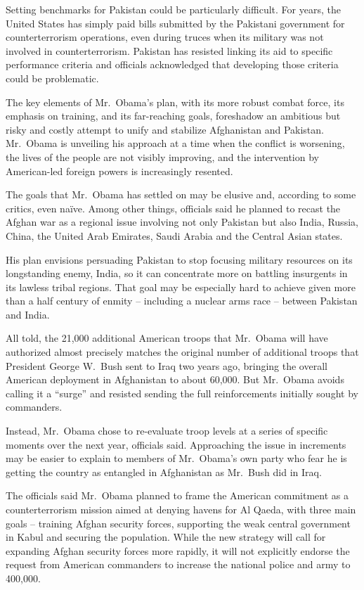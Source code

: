 \documentclass[12pt,a4paper,onecolumn]{article}
\begin{document}
\begin{CJK*}{GBK}{song}
Setting benchmarks for Pakistan could be particularly difficult. For years, the United States has
simply paid bills submitted by the Pakistani government for counterterrorism operations, even during
truces when its military was not involved in counterterrorism. Pakistan has resisted linking its aid
to specific performance criteria and officials acknowledged that developing those criteria could be
problematic.

The key elements of Mr.~Obama's plan, with its more robust combat force, its emphasis on training,
and its far-reaching goals, foreshadow an ambitious but risky and costly attempt to unify and
stabilize Afghanistan and Pakistan. Mr.~Obama is unveiling his approach at a time when the conflict
is worsening, the lives of the people are not visibly improving, and the intervention by
American-led foreign powers is increasingly resented.

The goals that Mr.~Obama has settled on may be elusive and, according to some critics, even na\"ive.
Among other things, officials said he planned to recast the Afghan war as a regional issue involving
not only Pakistan but also India, Russia, China, the United Arab Emirates, Saudi Arabia and the
Central Asian states.

His plan envisions persuading Pakistan to stop focusing military resources on its longstanding
enemy, India, so it can concentrate more on battling insurgents in its lawless tribal regions. That
goal may be especially hard to achieve given more than a half century of enmity -- including a
nuclear arms race -- between Pakistan and India.

All told, the 21,000 additional American troops that Mr.~Obama will have authorized almost precisely
matches the original number of additional troops that President George W.~Bush sent to Iraq two
years ago, bringing the overall American deployment in Afghanistan to about 60,000. But Mr.~Obama
avoids calling it a ``surge'' and resisted sending the full reinforcements initially sought by
commanders.

Instead, Mr.~Obama chose to re-evaluate troop levels at a series of specific moments over the next
year, officials said. Approaching the issue in increments may be easier to explain to members of
Mr.~Obama's own party who fear he is getting the country as entangled in Afghanistan as Mr.~Bush did
in Iraq.

The officials said Mr.~Obama planned to frame the American commitment as a counterterrorism mission
aimed at denying havens for Al Qaeda, with three main goals -- training Afghan security forces,
supporting the weak central government in Kabul and securing the population. While the new strategy
will call for expanding Afghan security forces more rapidly, it will not explicitly endorse the
request from American commanders to increase the national police and army to 400,000.


\end{CJK*}
\end{document}
